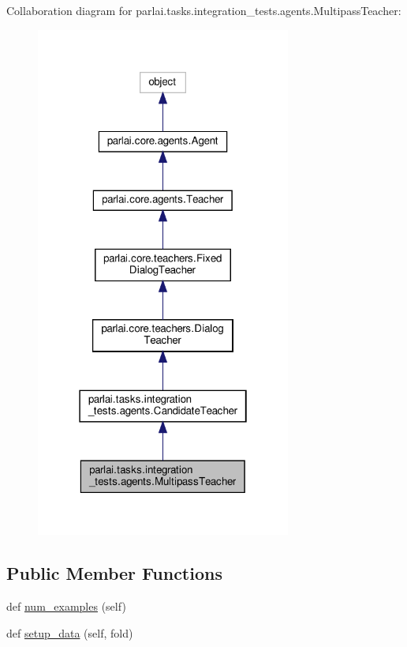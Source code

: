 Collaboration diagram for parlai.\+tasks.\+integration\+\_\+tests.\+agents.\+Multipass\+Teacher\+:
\nopagebreak
\begin{figure}[H]
\begin{center}
\leavevmode
\includegraphics[width=238pt]{classparlai_1_1tasks_1_1integration__tests_1_1agents_1_1MultipassTeacher__coll__graph}
\end{center}
\end{figure}
\subsection*{Public Member Functions}
\begin{DoxyCompactItemize}
\item 
def \hyperlink{classparlai_1_1tasks_1_1integration__tests_1_1agents_1_1MultipassTeacher_ae940c091daf534981c1cb5f42e38e8b2}{num\+\_\+examples} (self)
\item 
def \hyperlink{classparlai_1_1tasks_1_1integration__tests_1_1agents_1_1MultipassTeacher_a8f00304abda0184bc641db17143a6204}{setup\+\_\+data} (self, fold)
\end{DoxyCompactItemize}
